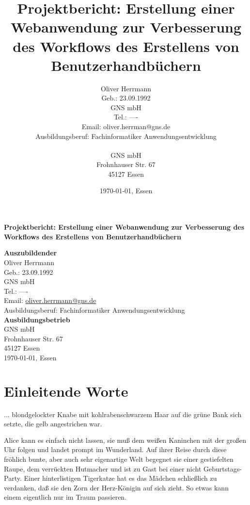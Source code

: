 \documentclass[12pt]{scrartcl}
\title{
	Projektbericht: Erstellung einer Webanwendung
	zur Verbesserung des Workflows des Erstellens von Benutzerhandbüchern
}
\author{
	Oliver Herrmann \\
	Geb.: 23.09.1992 \\
	GNS mbH \\
	Tel.: ---- \\
	Email: oliver.herrman@gns.de \\
	Ausbildungsberuf: Fachinformatiker Anwendungsentwicklung \\
	\\
	GNS mbH \\
	Frohnhauser Str. 67 \\
	45127 Essen
}
\date{\today, Essen}
\begin{document}
\thispagestyle{empty}

\begin{center}
	\huge \bfseries
		Projektbericht: Erstellung einer Webanwendung
		zur Verbesserung des Workflows des Erstellens von Benutzerhandbüchern \\[4cm]

	\Large	\mdseries

	\textbf{Auszubildender} \\
	Oliver Herrmann \\
	Geb.: 23.09.1992 \\
	GNS mbH \\
	Tel.: ---- \\
	Email: \href{mailto:oliver.herrmann@gns.de}{oliver.herrmann@gns.de}  \\
	Ausbildungsberuf: Fachinformatiker Anwendungsentwicklung \\[2cm]

	\textbf{Ausbildungsbetrieb} \\
	GNS mbH \\
	Frohnhauser Str. 67 \\
	45127 Essen \\[3cm]

	\today, Essen
\end{center}


\newpage

\tableofcontents
\newpage



\section{Einleitende Worte}
\label{sec:einleitende-worte}
...
blondgelockter Knabe mit kohlrabenschwarzem Haar auf die grüne Bank
sich setzte, die gelb angestrichen war.


Alice kann es einfach nicht lassen, sie muß dem weißen Kaninchen mit
der großen Uhr folgen und landet prompt im Wunderland. Auf ihrer Reise
durch diese fröhlich bunte, aber auch sehr eigenartige Welt begegnet
sie einer gestiefelten Raupe, dem verrückten Hutmacher und ist zu Gast
bei einer nicht Geburtstags-Party. Einer hinterlistigen Tigerkatze hat
es das Mädchen schließlich zu verdanken, daß sie den Zorn der
Herz-Königin auf sich zieht. So etwas kann einem eigentlich nur im
Traum passieren.
\end{document}
